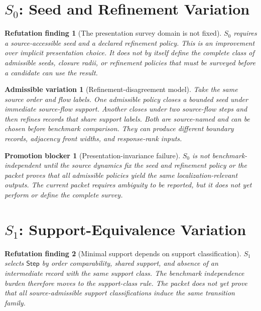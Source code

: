 \documentclass[11pt]{article}
\newcommand{\Step}{\mathsf{Step}}
\newtheorem{finding}{Refutation finding}
\newtheorem{variation}{Admissible variation}
\newtheorem{blocker}{Promotion blocker}
\begin{document}
\section{\texorpdfstring{\(S_0\)}{S0}: Seed and Refinement Variation}

\begin{finding}[The presentation survey domain is not fixed]
\(S_0\) requires a source-accessible seed and a declared refinement policy.
This is an improvement over implicit presentation choice. It does not by
itself define the complete class of admissible seeds, closure radii, or
refinement policies that must be surveyed before a candidate can use the
result.
\end{finding}

\begin{variation}[Refinement-disagreement model]
Take the same source order and flow labels. One admissible policy closes a
bounded seed under immediate source-flow support. Another closes under two
source-flow steps and then refines records that share support labels. Both
are source-named and can be chosen before benchmark comparison. They can
produce different boundary records, adjacency front widths, and response-rank
inputs.
\end{variation}

\begin{blocker}[Presentation-invariance failure]
\(S_0\) is not benchmark-independent until the source dynamics fix the seed
and refinement policy or the packet proves that all admissible policies yield
the same localization-relevant outputs. The current packet requires ambiguity
to be reported, but it does not yet perform or define the complete survey.
\end{blocker}

\section{\texorpdfstring{\(S_1\)}{S1}: Support-Equivalence Variation}

\begin{finding}[Minimal support depends on support classification]
\(S_1\) selects \(\Step\) by order comparability, shared support, and absence
of an intermediate record with the same support class. The benchmark
independence burden therefore moves to the support-class rule. The packet
does not yet prove that all source-admissible support classifications induce
the same transition family.
\end{finding}
\end{document}
